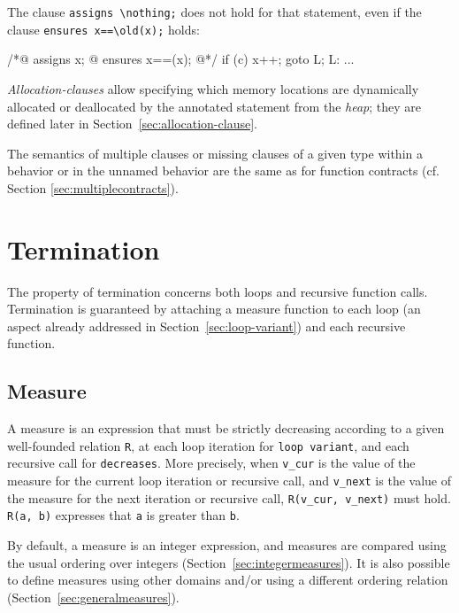 \begin{example} The clause \lstinline|assigns \nothing;| does not hold for that statement,
even if the clause \lstinline|ensures x==\old(x);| holds:
\begin{listing}{1}
/*@ assigns x;
  @ ensures x==\old(x);
  @*/
  if (c) {
    x++;
    goto L;
  }
L: ...
\end{listing}
\end{example}

\textsl{Allocation-clauses} allow specifying which memory locations
are dynamically allocated or deallocated by the annotated statement from the \textsl{heap};
they are defined later in Section~\ref{sec:allocation-clause}.

The semantics of multiple clauses or missing clauses of a given type within a behavior or in the
unnamed behavior are the same as for function contracts (cf. Section \ref{sec:multiplecontracts}).

\section{Termination}
\label{sec:termination}
The property of termination concerns both loops and recursive function
calls. Termination is guaranteed by attaching a measure function to each loop
(an aspect already addressed in Section~\ref{sec:loop-variant}) and each
recursive function.

\subsection{Measure}
\label{sec:measure}

A measure is an expression that must be strictly decreasing according to a
given well-founded relation \lstinline{R}, at each loop iteration for
\lstinline{loop variant}, and each recursive call for \lstinline{decreases}.
More precisely, when \lstinline{v_cur} is the value of the measure for the
current loop iteration or recursive call, and \lstinline{v_next} is the value
of the measure for the next iteration or recursive call,
\lstinline{R(v_cur, v_next)} must hold. \lstinline{R(a, b)} expresses that
\lstinline{a} is greater than \lstinline{b}.

By default, a measure is an integer expression, and measures are compared using
the usual ordering over integers (Section~\ref{sec:integermeasures}). It is also
possible to define measures using other domains and/or using a different
ordering relation (Section~\ref{sec:generalmeasures}).

